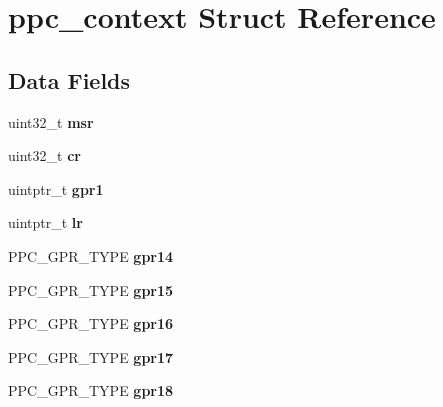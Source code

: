 \hypertarget{structppc__context}{}\section{ppc\+\_\+context Struct Reference}
\label{structppc__context}
\subsection*{Data Fields}
\begin{DoxyCompactItemize}
\item 
\mbox{\label{structppc__context_ae2c4001f73adbb06f1ce59fa3d48d32c}} 
uint32\+\_\+t {\bfseries msr}
\item 
\mbox{\label{structppc__context_ac74498dd158d538fd146439aa08669a7}} 
uint32\+\_\+t {\bfseries cr}
\item 
\mbox{\label{structppc__context_ad1fd324535edb6b3ff678e3f15464c2f}} 
uintptr\+\_\+t {\bfseries gpr1}
\item 
\mbox{\label{structppc__context_a84adc5c22bf2dbf890d1a4f565045a51}} 
uintptr\+\_\+t {\bfseries lr}
\item 
\mbox{\label{structppc__context_a6a4dbaec998295003755ffeb9884dfb2}} 
P\+P\+C\+\_\+\+G\+P\+R\+\_\+\+T\+Y\+PE {\bfseries gpr14}
\item 
\mbox{\label{structppc__context_ac68f84d2e9d1efa38b26f1390424f3a1}} 
P\+P\+C\+\_\+\+G\+P\+R\+\_\+\+T\+Y\+PE {\bfseries gpr15}
\item 
\mbox{\label{structppc__context_aea31038940f0418f6eb225c9020169c4}} 
P\+P\+C\+\_\+\+G\+P\+R\+\_\+\+T\+Y\+PE {\bfseries gpr16}
\item 
\mbox{\label{structppc__context_a979156cc1b86eed266752eabfcc103d7}} 
P\+P\+C\+\_\+\+G\+P\+R\+\_\+\+T\+Y\+PE {\bfseries gpr17}
\item 
\mbox{\label{structppc__context_a40f6d45b9f3f2ae21af57392c43b29be}} 
P\+P\+C\+\_\+\+G\+P\+R\+\_\+\+T\+Y\+PE {\bfseries gpr18}
\item 

\end{DoxyCompactItemize}
